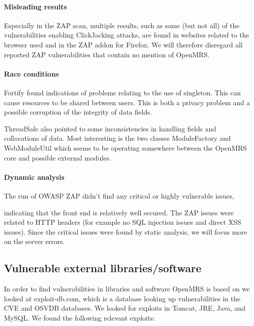 \documentclass{report} %
\begin{document}
\paragraph{Misleading results}
Especially in the ZAP scan, multiple results, such as some (but not all) of the
vulnerabilities enabling ClickJacking attacks, are found in websites related to
the browser used and in the ZAP addon for Firefox. We will therefore disregard
all reported ZAP vulnerabilities that contain no mention of OpenMRS.

\paragraph{Race conditions}
Fortify found indications of problems relating to the use of singleton. This can
cause resources to be shared between users. This is both a privacy problem and a
possible corruption of the integrity of data fields.\autocite[]{owaspracecondition}

ThreadSafe also pointed to some inconsistencies in handling fields and
collocations of data. Most interesting is the two classes ModuleFactory and
WebModuleUtil which seems to be operating somewhere between the OpenMRS core and
possible external modules.

\paragraph{Dynamic analysis}
The run of OWASP ZAP didn't find any critical or highly vulnerable issues,

indicating that the front end is relatively well secured. The ZAP issues were
related to HTTP headers (for example no SQL injection issues and direct XSS
issues). Since the critical issues were found by static analysis, we will focus
more on the server errors.

\subsection{Vulnerable external libraries/software}
In order to find vulnerabilities in libraries and software OpenMRS is based on
we looked at exploit-db.com, which is a database looking up vulnerabilities in
the CVE and OSVDB databases. We looked for exploits in Tomcat, JRE, Java, and
MySQL. We found the following relevant exploits:
\end{document}
